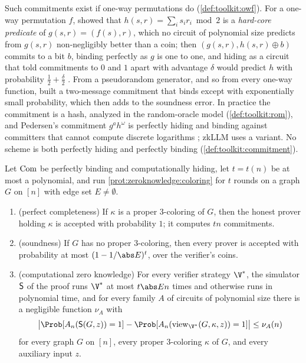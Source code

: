 \begin{refsection}
Such commitments exist if one-way permutations do (\cref{def:toolkit:owf}). For a one-way permutation $f$, \textcite{GoldreichLevin1989} showed that $h(s,r)=\sum_is_ir_i\bmod2$ is a \emph{hard-core predicate} of $g(s,r)=(f(s),r)$, which no circuit of polynomial size predicts from $g(s,r)$ non-negligibly better than a coin; then $(g(s,r),h(s,r)\oplus b)$ commits to a bit $b$, binding perfectly as $g$ is one to one, and hiding as a circuit that told commitments to $0$ and $1$ apart with advantage $\delta$ would predict $h$ with probability $\frac12+\frac\delta2$ \parencite[Chapter~4]{Goldreich2001}. From a pseudorandom generator, and so from every one-way function, \textcite{Naor1991} built a two-message commitment that binds except with exponentially small probability, which then adds to the soundness error. In practice the commitment is a hash, analyzed in the random-oracle model (\cref{def:toolkit:rom}), and Pedersen's commitment $g^ah^\omega$ is perfectly hiding and binding against committers that cannot compute discrete logarithms \parencite{Pedersen1991}; zkLLM uses a variant. No scheme is both perfectly hiding and perfectly binding (\cref{def:toolkit:commitment}).

\begin{theorem}\label{thm:zeroknowledge:np}
Let $\mathrm{Com}$ be perfectly binding and computationally hiding, let $t=t(n)$ be at most a polynomial, and run \cref{prot:zeroknowledge:coloring} for $t$ rounds on a graph $G$ on $[n]$ with edge set $E\ne\emptyset$.
\begin{enumerate}
\item (perfect completeness) If $\kappa$ is a proper 3-coloring of $G$, then the honest prover holding $\kappa$ is accepted with probability $1$; it computes $tn$ commitments.
\item (soundness) If $G$ has no proper 3-coloring, then every prover is accepted with probability at most $(1-1/\abs E)^t$, over the verifier's coins.
\item (computational zero knowledge) For every verifier strategy $\V^*$, the simulator $\mathsf{S}$ of the proof runs $\V^*$ at most $t\abs En$ times and otherwise runs in polynomial time, and for every family $A$ of circuits of polynomial size there is a negligible function $\nu_A$ with
\[
\bigl|\Prob[A_n(\zeroknowledgesim(G,z))=1]-\Prob[A_n(\zeroknowledgeview_{\V^*}(G,\kappa,z))=1]\bigr|\le\nu_A(n)
\]
for every graph $G$ on $[n]$, every proper 3-coloring $\kappa$ of $G$, and every auxiliary input $z$.
\end{enumerate}
\end{theorem}


\end{refsection}
